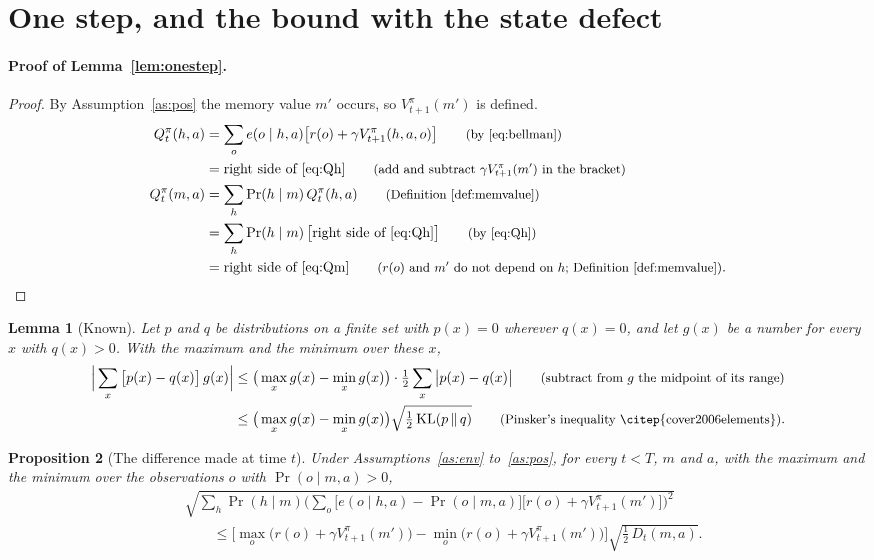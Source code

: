 \documentclass{article}
\newtheorem{proposition}{Proposition}[section]
\newtheorem{lemma}[proposition]{Lemma}
\theoremstyle{definition}
\newcommand{\KL}{\mathrm{KL}}
\newcommand{\why}[1]{\tag*{\small(#1)}}
\begin{document}
\section{One step, and the bound with the state defect}\label{sec:layer2}

\paragraph{Proof of Lemma~\ref{lem:onestep}.}
\begin{proof}
By Assumption~\ref{as:pos} the memory value $m'$ occurs, so $V^\pi_{t+1}(m')$ is defined.
\begin{align*}
Q^\pi_t(h,a)&=\sum_oe(o\mid h,a)\big[r(o)+\gamma V^\pi_{t+1}(h,a,o)\big] \why{by \eqref{eq:bellman}}\\
&=\text{right side of \eqref{eq:Qh}} \why{add and subtract $\gamma V^\pi_{t+1}(m')$ in the bracket}\\
Q^\pi_t(m,a)&=\sum_h\Pr(h\mid m)\,Q^\pi_t(h,a) \why{Definition~\ref{def:memvalue}}\\
&=\sum_h\Pr(h\mid m)\,\big[\text{right side of \eqref{eq:Qh}}\big] \why{by \eqref{eq:Qh}}\\
&=\text{right side of \eqref{eq:Qm}} \why{$r(o)$ and $m'$ do not depend on $h$; Definition~\ref{def:memvalue}}.
\end{align*}
\end{proof}

\begin{lemma}[Known]\label{lem:tool}
Let $p$ and $q$ be distributions on a finite set with $p(x)=0$ wherever $q(x)=0$, and let $g(x)$ be a number for every $x$ with $q(x)>0$. With the maximum and the minimum over these $x$,
\begin{align*}
\Big|\sum_x\big[p(x)-q(x)\big]\,g(x)\Big|
&\le\big(\max_xg(x)-\min_xg(x)\big)\cdot\tfrac12\sum_x\big|p(x)-q(x)\big| \why{subtract from $g$ the midpoint of its range}\\
&\le\big(\max_xg(x)-\min_xg(x)\big)\sqrt{\tfrac12\,\KL(p\,\|\,q)} \why{Pinsker's inequality \citep{cover2006elements}}.
\end{align*}
\end{lemma}

\begin{proposition}[The difference made at time $t$]\label{prop:now}
Under Assumptions~\ref{as:env} to~\ref{as:pos}, for every $t<T$, $m$ and $a$, with the maximum and the minimum over the observations $o$ with $\Pr(o\mid m,a)>0$,
\begin{align*}
&\sqrt{\sum_h\Pr(h\mid m)\Big(\sum_o\big[e(o\mid h,a)-\Pr(o\mid m,a)\big]\big[r(o)+\gamma V^\pi_{t+1}(m')\big]\Big)^2}\\
&\qquad\le\Big[\max_o\big(r(o)+\gamma V^\pi_{t+1}(m')\big)-\min_o\big(r(o)+\gamma V^\pi_{t+1}(m')\big)\Big]\sqrt{\tfrac12\,D_t(m,a)}.
\end{align*}
\end{proposition}
\end{document}
